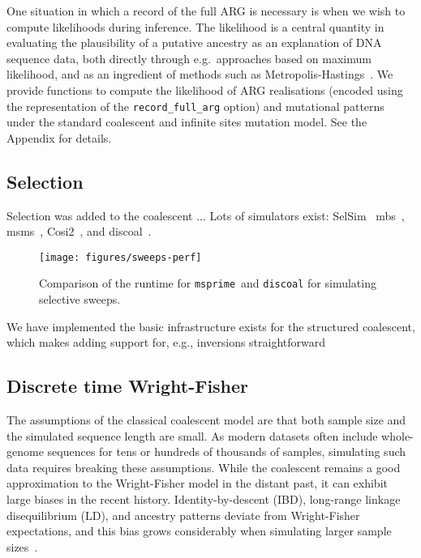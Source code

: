 \documentclass{article}
\newcommand{\msprime}[0]{\texttt{msprime}}
\begin{document}
One situation in which a record of the full ARG is necessary is when we
wish to compute likelihoods during inference.
The likelihood is a central quantity in evaluating the plausibility of a putative
ancestry as an explanation of DNA sequence data, both directly through
e.g.~approaches based on maximum likelihood, and as an ingredient of
methods such as
Metropolis-Hastings~\citep{kuhner2000maximum,nielsen2000estimation,wang2008bayesian}.
We provide functions to compute the likelihood of ARG realisations
(encoded using the representation of the \texttt{record\_full\_arg} option)
and mutational patterns under
the standard coalescent and infinite sites mutation model.
See the Appendix for details.

\subsection*{Selection}
Selection was added to the coalescent ... Lots of simulators exist:
SelSim~\citep{spencer2004selsim}
mbs~\citep{teshima2009mbs},
msms~\citep{ewing2010msms},
Cosi2~\citep{shlyakhter2014cosi2},
and discoal~\citep{kern2016discoal}.

\begin{figure}
\texttt{[image: figures/sweeps-perf]}
\caption{\label{fig-selection-perf}Comparison of the runtime for
\msprime\ and \texttt{discoal} for simulating selective sweeps.
}
\end{figure}

We have implemented the basic infrastructure exists for the structured
coalescent, which makes adding support for, e.g.,
inversions straightforward~\citep{peischl2013sequential}

\subsection*{Discrete time Wright-Fisher}

The assumptions of the classical coalescent model are that both sample size and
the simulated sequence length are small. As modern datasets often include
whole-genome sequences for tens or hundreds of thousands of samples, simulating
such data requires breaking these assumptions. While the coalescent remains a
good approximation to the Wright-Fisher model in the distant past, it can
exhibit large biases in the recent history. Identity-by-descent (IBD),
long-range linkage disequilibrium (LD), and ancestry patterns deviate from
Wright-Fisher expectations, and this bias grows considerably when simulating
larger sample
sizes~\citep{wakeley2012gene,bhaskar2014distortion,nelson2020accounting}.
\end{document}
